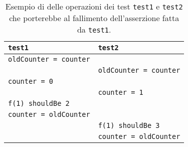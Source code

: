 \begin{table}[!ht]
  \centering
  \begin{tabular}{ll}
    \toprule
    \lstinline|test1|                & \lstinline|test2|                \\
    \midrule
    \lstinline|oldCounter = counter| &                                  \\
                                     & \lstinline|oldCounter = counter| \\
    \lstinline|counter = 0|          &                                  \\
                                     & \lstinline|counter = 1|          \\
    \lstinline|f(1) shouldBe 2|      &                                  \\
    \lstinline|counter = oldCounter| &                                  \\
                                     & \lstinline|f(1) shouldBe 3|      \\
                                     & \lstinline|counter = oldCounter| \\
    \bottomrule
  \end{tabular}
  \caption{Esempio di  delle operazioni dei test \lstinline|test1| e \lstinline|test2| che porterebbe al fallimento dell'asserzione fatta da \lstinline|test1|.}
  \label{table:test-f-interleaving-fail}
\end{table}